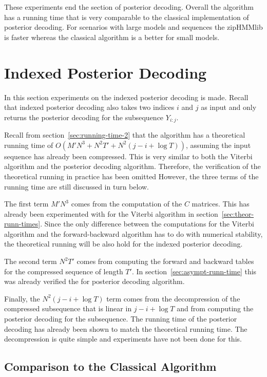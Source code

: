 These experiments end the section of posterior decoding. Overall the algorithm
has a running time that is very comparable to the classical implementation of
posterior decoding. For scenarios with large models and sequences the zipHMMlib
is faster whereas the classical algorithm is a better for small models.

\section{Indexed Posterior Decoding}

In this section experiments on the indexed posterior decoding is
made. Recall that indexed posterior decoding also takes two indices $i$ and
$j$ as input and only returns the posterior decoding for the subsequence
$Y_{i:j}$.

Recall from section~\ref{sec:running-time-2} that the algorithm has a
theoretical running time of $O(M' N^3 + N^2 T' + N^2 (j - i + \log T))$,
assuming the input sequence has already been compressed. This is very similar
to both the Viterbi algorithm and the posterior decoding algorithm. Therefore,
the verification of the theoretical running in practice has been omitted
However, the three terms of the running time are still discussed in turn below.

The first term $M' N^3$ comes from the computation of the $C$ matrices. This
has already been experimented with for the Viterbi algorithm in
section~\ref{sec:theor-runn-times}. Since the only difference between the
computations for the Viterbi algorithm and the forward-backward algorithm has
to do with numerical stability, the theoretical running will be also hold for
the indexed posterior decoding.

The second term $N^2 T'$ comes from computing the forward and backward tables
for the compressed sequence of length $T'$. In
section~\ref{sec:asympt-runn-time} this was already verified the for posterior
decoding algorithm.

Finally, the $N^2 (j - i + \log T)$ term comes from the decompression of the
compressed subsequence that is linear in $j - i + \log T$ and from computing
the posterior decoding for the subsequence. The running time of the posterior
decoding has already been shown to match the theoretical running time. The
decompression is quite simple and experiments have not been done for
this. 

\subsection{Comparison to the Classical Algorithm}

